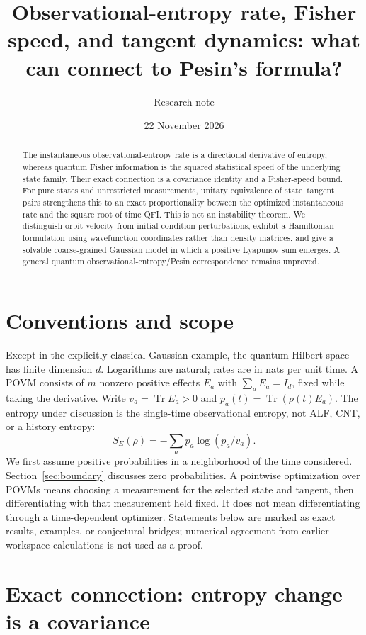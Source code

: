 \documentclass[11pt,a4paper]{article}
\DeclareMathOperator{\Tr}{Tr}
\begin{document}
\title{Observational-entropy rate, Fisher speed, and tangent dynamics: what can connect to Pesin's formula?}
\author{Research note}
\date{22 November 2026}
\maketitle
\begin{abstract}
The instantaneous observational-entropy rate is a directional derivative of entropy, whereas quantum Fisher information is the squared statistical speed of the underlying state family. Their exact connection is a covariance identity and a Fisher-speed bound. For pure states and unrestricted measurements, unitary equivalence of state--tangent pairs strengthens this to an exact proportionality between the optimized instantaneous rate and the square root of time QFI. This is not an instability theorem. We distinguish orbit velocity from initial-condition perturbations, exhibit a Hamiltonian formulation using wavefunction coordinates rather than density matrices, and give a solvable coarse-grained Gaussian model in which a positive Lyapunov sum emerges. A general quantum observational-entropy/Pesin correspondence remains unproved.
\end{abstract}

\section{Conventions and scope}
Except in the explicitly classical Gaussian example, the quantum Hilbert space has finite dimension $d$. Logarithms are natural; rates are in nats per unit time. A POVM consists of $m$ nonzero positive effects $E_a$ with $\sum_aE_a=I_d$, fixed while taking the derivative. Write $v_a=\Tr E_a>0$ and $p_a(t)=\Tr(\rho(t)E_a)$. The entropy under discussion is the single-time observational entropy, not ALF, CNT, or a history entropy:
\[S_E(\rho)=-\sum_a p_a\log(p_a/v_a).\]
We first assume positive probabilities in a neighborhood of the time considered. Section~\ref{sec:boundary} discusses zero probabilities. A pointwise optimization over POVMs means choosing a measurement for the selected state and tangent, then differentiating with that measurement held fixed. It does not mean differentiating through a time-dependent optimizer. Statements below are marked as exact results, examples, or conjectural bridges; numerical agreement from earlier workspace calculations is not used as a proof.

\section{Exact connection: entropy change is a covariance}
\end{document}
